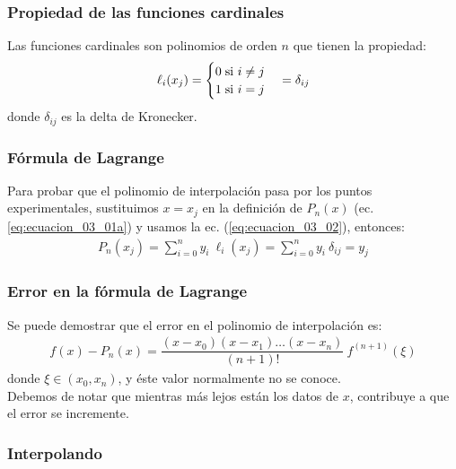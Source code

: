 \documentclass[12pt]{beamer}
\begin{document}
\begin{frame}
\frametitle{Propiedad de las funciones cardinales}
Las funciones cardinales son polinomios de orden $n$ que tienen la propiedad:
\pause
\begin{align}
\ell_{i} (x_{j}) = \begin{cases} 0 \hspace{0.1cm} \mbox{si } i \neq j \\ 
1 \hspace{0.1cm} \mbox{si } i = j \end{cases} = \delta_{ij}
\label{eq:ecuacion_03_02}
\end{align}
donde $\delta_{ij}$ es la delta de Kronecker.
\end{frame}
\begin{frame}
\frametitle{Fórmula de Lagrange}
Para probar que el polinomio de interpolación pasa por los puntos experimentales, sustituimos $x = x_{j}$ en la definición de $P_{n} (x)$ (ec. \ref{eq:ecuacion_03_01a}) y usamos la ec. (\ref{eq:ecuacion_03_02}), entonces:
\pause
\begin{align*}
P_{n} (x_{j}) = \sum_{i = 0}^{n} y_{i} \: \ell_{i}(x_{j}) = \sum_{i = 0}^{n} y_{i} \: \delta_{ij} = y_{j}
\end{align*}
\end{frame}
\begin{frame}
\frametitle{Error en la fórmula de Lagrange}
Se puede demostrar que el error en el polinomio de interpolación es:
\pause
\begin{align*}
f(x) - P_{n} (x) = \dfrac{(x - x_{0})(x - x_{1}) \ldots (x - x_{n})}{(n + 1)!} \: f^{(n+1)} (\xi)
\end{align*}
donde $\xi \in (x_{0},x_{n})$, y éste valor normalmente no se conoce. 
\\
\bigskip
\pause
Debemos de notar que mientras más lejos están los datos de $x$, contribuye a que el error se incremente. 
\end{frame}

\subsubsection{Interpolando}
\end{document}
